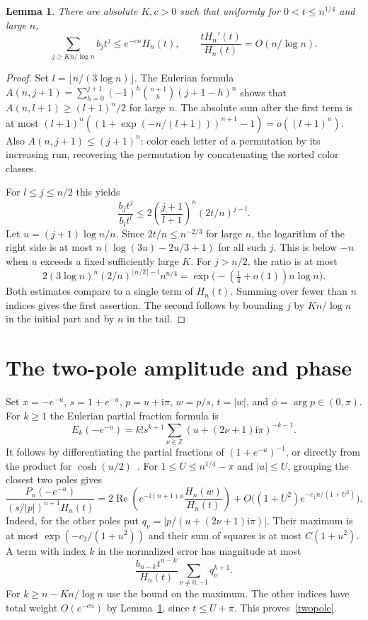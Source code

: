 \documentclass[11pt]{article}
\newtheorem{lemma}[theorem]{Lemma}
\newcommand{\ii}{\mathrm{i}}
\begin{document}
\begin{lemma}\label{tilt}
There are absolute $K,c>0$ such that uniformly for $0<t\le n^{1/4}$ and large $n$,
\[
 \sum_{j\ge K n/\log n} b_jt^j\le e^{-cn}H_n(t),
 \qquad \frac{tH_n'(t)}{H_n(t)}=O(n/\log n).
\]
\end{lemma}
\begin{proof}
Set $l=\lfloor n/(3\log n)\rfloor$. The Eulerian formula
$A(n,j+1)=\sum_{h=0}^{j+1}(-1)^h\binom{n+1}{h}(j+1-h)^n$
shows that $A(n,l+1)\ge(l+1)^n/2$ for large $n$. The absolute sum after the first term is at most $(l+1)^n((1+\exp(-n/(l+1)))^{n+1}-1)=o((l+1)^n)$. Also $A(n,j+1)\le(j+1)^n$: color each letter of a permutation by its increasing run, recovering the permutation by concatenating the sorted color classes.

For $l\le j\le n/2$ this yields
\[
 \frac{b_jt^j}{b_l t^l}\le
 2\left(\frac{j+1}{l+1}\right)^n(2t/n)^{j-l}.
\]
Let $u=(j+1)\log n/n$. Since $2t/n\le n^{-2/3}$ for large $n$, the logarithm of the right side is at most $n(\log(3u)-2u/3+1)$ for all such $j$. This is below $-n$ when $u$ exceeds a fixed sufficiently large $K$. For $j>n/2$, the ratio is at most
\[
 2(3\log n)^n(2/n)^{\lfloor n/2\rfloor-l}n^{n/4}=\exp\bigl(-(\tfrac14+o(1))n\log n\bigr).
\]
Both estimates compare to a single term of $H_n(t)$. Summing over fewer than $n$ indices gives the first assertion. The second follows by bounding $j$ by $Kn/\log n$ in the initial part and by $n$ in the tail.
\end{proof}

\section{The two-pole amplitude and phase}

Set $x=-e^{-u}$, $s=1+e^{-u}$, $p=u+\ii\pi$, $w=p/s$, $t=|w|$, and $\phi=\arg p\in(0,\pi)$. For $k\ge1$ the Eulerian partial fraction formula is
\[
 E_k(-e^{-u})=k!s^{k+1}\sum_{\nu\in\mathbb Z}
                      (u+(2\nu+1)\ii\pi)^{-k-1}.
\]
It follows by differentiating the partial fractions of $(1+e^{-u})^{-1}$, or directly from the product for $\cosh(u/2)$~\cite{bulk}.
For $1\le U\le n^{1/4}-\pi$ and $|u|\le U$, grouping the closest two poles gives
\begin{equation}\label{twopole}
 \frac{P_n(-e^{-u})}{(s/|p|)^{n+1}H_n(t)}
 = 2\operatorname{Re}\left(e^{-\ii(n+1)\phi}\frac{H_n(w)}{H_n(t)}\right)
   +O\big((1+U^2)e^{-c_1n/(1+U^2)}\big).
\end{equation}
Indeed, for the other poles put $q_\nu=|p/(u+(2\nu+1)\ii\pi)|$. Their maximum is at most $\exp(-c_2/(1+u^2))$ and their sum of squares is at most $C(1+u^2)$. A term with index $k$ in the normalized error has magnitude at most
\[
 \frac{b_{n-k}t^{n-k}}{H_n(t)}\sum_{\nu\ne0,-1}q_\nu^{k+1}.
\]
For $k\ge n-Kn/\log n$ use the bound on the maximum. The other indices have total weight $O(e^{-cn})$ by Lemma~\ref{tilt}, since $t\le U+\pi$. This proves~\eqref{twopole}.
\end{document}
